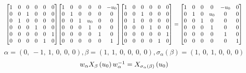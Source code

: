 \documentclass[11pt]{article}
\theoremstyle{definition}
\begin{document}
\[
\scaletoalign{\textwidth}{{\left[\begin{matrix}1 & 0 & 0 & 0 & 0 & 0\\0 & 0 & 1 & 0 & 0 & 0\\0 & 1 & 0 & 0 & 0 & 0\\0 & 0 & 0 & 1 & 0 & 0\\0 & 0 & 0 & 0 & 0 & 1\\0 & 0 & 0 & 0 & 1 & 0\end{matrix}\right]} {\left[\begin{matrix}1 & 0 & 0 & 0 & 0 & - u_{0}\\0 & 1 & 0 & 0 & 0 & 0\\0 & 0 & 1 & u_{0} & 0 & 0\\0 & 0 & 0 & 1 & 0 & 0\\0 & 0 & 0 & 0 & 1 & 0\\0 & 0 & 0 & 0 & 0 & 1\end{matrix}\right]} {\left[\begin{matrix}1 & 0 & 0 & 0 & 0 & 0\\0 & 0 & 1 & 0 & 0 & 0\\0 & 1 & 0 & 0 & 0 & 0\\0 & 0 & 0 & 1 & 0 & 0\\0 & 0 & 0 & 0 & 0 & 1\\0 & 0 & 0 & 0 & 1 & 0\end{matrix}\right]} = {\left[\begin{matrix}1 & 0 & 0 & 0 & - u_{0} & 0\\0 & 1 & 0 & u_{0} & 0 & 0\\0 & 0 & 1 & 0 & 0 & 0\\0 & 0 & 0 & 1 & 0 & 0\\0 & 0 & 0 & 0 & 1 & 0\\0 & 0 & 0 & 0 & 0 & 1\end{matrix}\right]}}
\]
\[
\alpha = \left( 0, \  -1, \  1, \  0, \  0, \  0\right), \beta = \left( 1, \  1, \  0, \  0, \  0, \  0\right), \sigma_{\alpha}(\beta) = \left( 1, \  0, \  1, \  0, \  0, \  0\right)
\]
\[
\scaletoalign{\textwidth}{w_{\alpha} X_{\beta}\left(u_{0}\right) w_{\alpha}^{-1} = X_{\sigma_{\alpha}\left(\beta\right)}\left(u_{0}\right)}
\]
\end{document}
